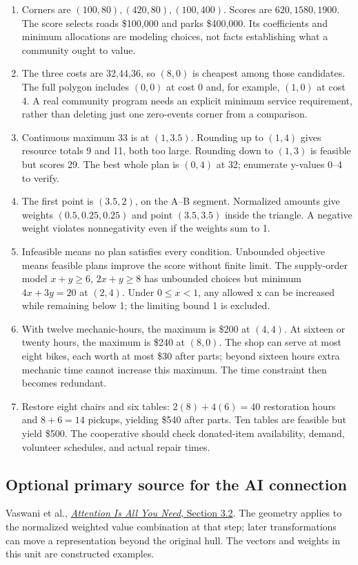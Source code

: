 \documentclass[11pt,letterpaper]{article}
\begin{document}
{\begin{enumerate}
\item Corners are $(100,80),(420,80),(100,400)$. Scores are $620,1580,1900$. The score selects roads \$100,000 and parks \$400,000. Its coefficients and minimum allocations are modeling choices, not facts establishing what a community ought to value.
\item The three costs are 32,44,36, so $(8,0)$ is cheapest among those candidates. The full polygon includes $(0,0)$ at cost 0 and, for example, $(1,0)$ at cost 4. A real community program needs an explicit minimum service requirement, rather than deleting just one zero-events corner from a comparison.
\item Continuous maximum 33 is at $(1,3.5)$. Rounding up to $(1,4)$ gives resource totals 9 and 11, both too large. Rounding down to $(1,3)$ is feasible but scores 29. The best whole plan is $(0,4)$ at 32; enumerate y-values 0--4 to verify.
\item The first point is $(3.5,2)$, on the A--B segment. Normalized amounts give weights $(0.5,0.25,0.25)$ and point $(3.5,3.5)$ inside the triangle. A negative weight violates nonnegativity even if the weights sum to 1.
\item Infeasible means no plan satisfies every condition. Unbounded objective means feasible plans improve the score without finite limit. The supply-order model $x+y\geq6$, $2x+y\geq8$ has unbounded choices but minimum $4x+3y=20$ at $(2,4)$. Under $0\leq x<1$, any allowed x can be increased while remaining below 1; the limiting bound 1 is excluded.
\item With twelve mechanic-hours, the maximum is \$200 at $(4,4)$. At sixteen or twenty hours, the maximum is \$240 at $(8,0)$. The shop can serve at most eight bikes, each worth at most \$30 after parts; beyond sixteen hours extra mechanic time cannot increase this maximum. The time constraint then becomes redundant.
\item Restore eight chairs and six tables: $2(8)+4(6)=40$ restoration hours and $8+6=14$ pickups, yielding \$540 after parts. Ten tables are feasible but yield \$500. The cooperative should check donated-item availability, demand, volunteer schedules, and actual repair times.
\end{enumerate}
\subsection*{Optional primary source for the AI connection}
Vaswani et al., \href{https://arxiv.org/html/1706.03762v7#S3.SS2}{\emph{Attention Is All You Need}, Section 3.2}. The geometry applies to the normalized weighted value combination at that step; later transformations can move a representation beyond the original hull. The vectors and weights in this unit are constructed examples.
}
\end{document}
